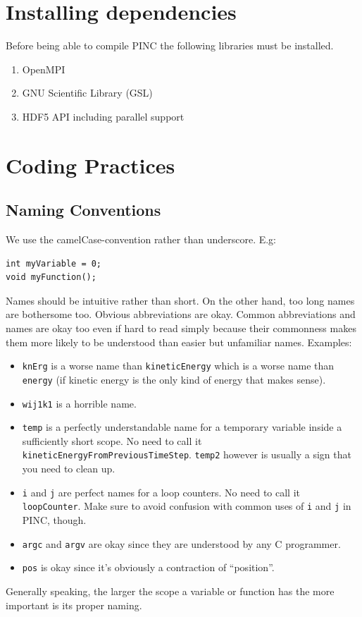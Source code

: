 \documentclass[10pt,a4paper]{article}
\begin{document}
\section{Installing dependencies}\label{sec:dependencies}
Before being able to compile PINC the following libraries must be installed.
\begin{enumerate}
	\item OpenMPI
	\item GNU Scientific Library (GSL)
	\item HDF5 API including parallel support
\end{enumerate}

\section{Coding Practices}

\subsection{Naming Conventions}
We use the camelCase-convention rather than underscore. E.g:
\begin{lstlisting}
int myVariable = 0;
void myFunction();
\end{lstlisting}
Names should be intuitive rather than short. On the other hand, too long names are bothersome too. Obvious abbreviations are okay. Common abbreviations and names are okay too even if hard to read simply because their commonness makes them more likely to be understood than easier but unfamiliar names. Examples:
	\begin{itemize}
		\item \lstinline$knErg$ is a worse name than \lstinline$kineticEnergy$ which is a worse name than \lstinline$energy$ (if kinetic energy is the only kind of energy that makes sense).
		\item \lstinline$wij1k1$ is a horrible name.
		\item \lstinline$temp$ is a perfectly understandable name for a temporary variable inside a sufficiently short scope. No need to call it \lstinline$kineticEnergyFromPreviousTimeStep$. \lstinline$temp2$ however is usually a sign that you need to clean up.
		\item \lstinline$i$ and \lstinline$j$ are perfect names for a loop counters. No need to call it \lstinline$loopCounter$. Make sure to avoid confusion with common uses of \lstinline$i$ and \lstinline$j$ in PINC, though.
		\item \lstinline$argc$ and \lstinline$argv$ are okay since they are understood by any C programmer.
		\item \lstinline$pos$ is okay since it's obviously a contraction of ``position''.
	\end{itemize}
Generally speaking, the larger the scope a variable or function has the more important is its proper naming.
\end{document}
